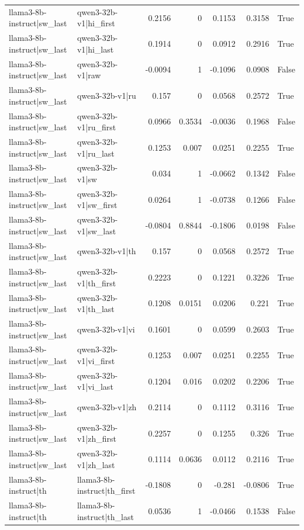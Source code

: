 \begin{table}
\begin{tabular}{l l r r r r l}
llama3-8b-instruct|sw_last & qwen3-32b-v1|hi_first & 0.2156 & 0 & 0.1153 & 0.3158 & True \\
llama3-8b-instruct|sw_last & qwen3-32b-v1|hi_last & 0.1914 & 0 & 0.0912 & 0.2916 & True \\
llama3-8b-instruct|sw_last & qwen3-32b-v1|raw & -0.0094 & 1 & -0.1096 & 0.0908 & False \\
llama3-8b-instruct|sw_last & qwen3-32b-v1|ru & 0.157 & 0 & 0.0568 & 0.2572 & True \\
llama3-8b-instruct|sw_last & qwen3-32b-v1|ru_first & 0.0966 & 0.3534 & -0.0036 & 0.1968 & False \\
llama3-8b-instruct|sw_last & qwen3-32b-v1|ru_last & 0.1253 & 0.007 & 0.0251 & 0.2255 & True \\
llama3-8b-instruct|sw_last & qwen3-32b-v1|sw & 0.034 & 1 & -0.0662 & 0.1342 & False \\
llama3-8b-instruct|sw_last & qwen3-32b-v1|sw_first & 0.0264 & 1 & -0.0738 & 0.1266 & False \\
llama3-8b-instruct|sw_last & qwen3-32b-v1|sw_last & -0.0804 & 0.8844 & -0.1806 & 0.0198 & False \\
llama3-8b-instruct|sw_last & qwen3-32b-v1|th & 0.157 & 0 & 0.0568 & 0.2572 & True \\
llama3-8b-instruct|sw_last & qwen3-32b-v1|th_first & 0.2223 & 0 & 0.1221 & 0.3226 & True \\
llama3-8b-instruct|sw_last & qwen3-32b-v1|th_last & 0.1208 & 0.0151 & 0.0206 & 0.221 & True \\
llama3-8b-instruct|sw_last & qwen3-32b-v1|vi & 0.1601 & 0 & 0.0599 & 0.2603 & True \\
llama3-8b-instruct|sw_last & qwen3-32b-v1|vi_first & 0.1253 & 0.007 & 0.0251 & 0.2255 & True \\
llama3-8b-instruct|sw_last & qwen3-32b-v1|vi_last & 0.1204 & 0.016 & 0.0202 & 0.2206 & True \\
llama3-8b-instruct|sw_last & qwen3-32b-v1|zh & 0.2114 & 0 & 0.1112 & 0.3116 & True \\
llama3-8b-instruct|sw_last & qwen3-32b-v1|zh_first & 0.2257 & 0 & 0.1255 & 0.326 & True \\
llama3-8b-instruct|sw_last & qwen3-32b-v1|zh_last & 0.1114 & 0.0636 & 0.0112 & 0.2116 & True \\
llama3-8b-instruct|th & llama3-8b-instruct|th_first & -0.1808 & 0 & -0.281 & -0.0806 & True \\
llama3-8b-instruct|th & llama3-8b-instruct|th_last & 0.0536 & 1 & -0.0466 & 0.1538 & False \\

\end{tabular}
\end{table}
